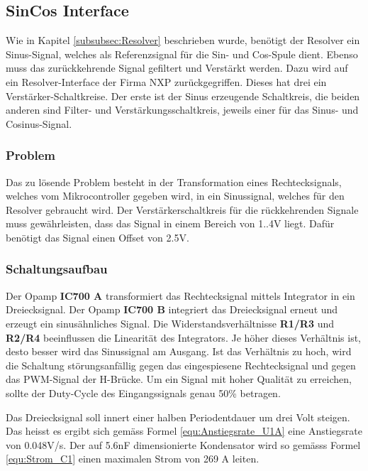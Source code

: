 \subsection{SinCos Interface}\label{subsec:SinCos_Interface}
Wie in Kapitel \ref{subsubsec:Resolver} beschrieben wurde, benötigt der Resolver ein Sinus-Signal, welches als Referenzsignal für die Sin- und Cos-Spule dient. Ebenso muss das zurückkehrende Signal gefiltert und Verstärkt werden.
Dazu wird auf ein Resolver-Interface der Firma NXP zurückgegriffen. Dieses hat drei ein Verstärker-Schaltkreise. Der erste ist der Sinus erzeugende Schaltkreis, die beiden anderen sind Filter- und Verstärkungsschaltkreis, jeweils einer für das Sinus- und Cosinus-Signal.

\subsubsection{Problem}\label{subsubsec:Problem_TMC6200}

Das zu lösende Problem besteht in der Transformation eines Rechtecksignals, welches vom Mikrocontroller gegeben wird, in ein Sinussignal, welches für den Resolver gebraucht wird. Der Verstärkerschaltkreis für die rückkehrenden Signale muss gewährleisten, dass das Signal in einem Bereich von 1..4V liegt. Dafür benötigt das Signal einen Offset von 2.5V.

\subsubsection{Schaltungsaufbau}\label{subsubsec:Schaltungsaufbau_TMC6200}

Der Opamp \textbf{IC700 A} transformiert das Rechtecksignal mittels Integrator in ein Dreiecksignal. Der Opamp \textbf{IC700 B} integriert das Dreiecksignal erneut und erzeugt ein sinusähnliches Signal.
Die Widerstandsverhältnisse \textbf{R1/R3} und \textbf{R2/R4} beeinflussen die Linearität des Integrators. Je höher dieses Verhältnis ist, desto besser wird das Sinussignal am Ausgang. Ist das Verhältnis zu hoch, wird die Schaltung störungsanfällig gegen das eingespiesene Rechtecksignal und gegen das PWM-Signal der H-Brücke. Um ein Signal mit hoher Qualität zu erreichen, sollte der Duty-Cycle des Eingangssignals genau 50\% betragen.

Das Dreiecksignal soll innert einer halben Periodentdauer um drei Volt steigen. Das heisst es ergibt sich gemäss Formel \ref{equ:Anstiegsrate_U1A} eine Anstiegsrate von 0.048V/\textmu s.
Der auf 5.6nF dimensionierte Kondensator wird so gemässs Formel \ref{equ:Strom_C1} einen maximalen Strom von 269 \textmu A leiten.

